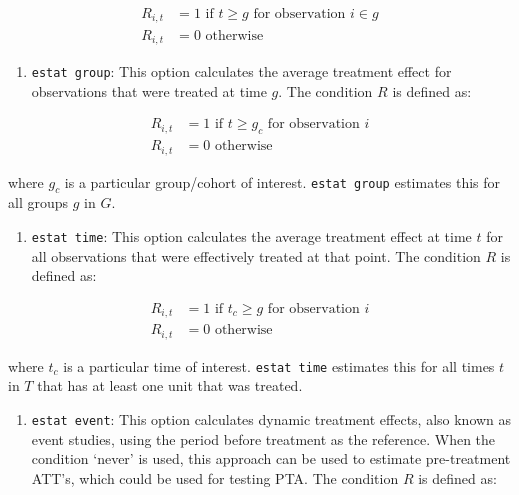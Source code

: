 \documentclass[
  letterpaper,
  DIV=11,
  numbers=noendperiod]{scrartcl}
\providecommand{\tightlist}{%
  \setlength{\itemsep}{0pt}\setlength{\parskip}{0pt}}\usepackage{longtable,booktabs,array}
\begin{document}
\[\begin{aligned}
R_{i,t} &= 1 \text{ if } t \geq g \text{ for observation } i \in g \\
R_{i,t} &= 0 \text{ otherwise}
\end{aligned}
\]

\begin{enumerate}
\def\labelenumi{\arabic{enumi}.}
\setcounter{enumi}{1}
\tightlist
\item
  \texttt{estat\ group}: This option calculates the average treatment
  effect for observations that were treated at time \(g\). The condition
  \(R\) is defined as:
\end{enumerate}

\[\begin{aligned}
R_{i,t} &= 1 \text{ if } t \geq g_c \text{ for observation } i \\
R_{i,t} &= 0 \text{ otherwise}
\end{aligned}
\]

where \(g_c\) is a particular group/cohort of interest.
\texttt{estat\ group} estimates this for all groups \(g\) in \(G\).

\begin{enumerate}
\def\labelenumi{\arabic{enumi}.}
\setcounter{enumi}{2}
\tightlist
\item
  \texttt{estat\ time}: This option calculates the average treatment
  effect at time \(t\) for all observations that were effectively
  treated at that point. The condition \(R\) is defined as:
\end{enumerate}

\[\begin{aligned}
R_{i,t} &= 1 \text{ if } t_c \geq g \text{ for observation } i \\
R_{i,t} &= 0 \text{ otherwise}
\end{aligned}
\]

where \(t_c\) is a particular time of interest. \texttt{estat\ time}
estimates this for all times \(t\) in \(T\) that has at least one unit
that was treated.

\begin{enumerate}
\def\labelenumi{\arabic{enumi}.}
\setcounter{enumi}{3}
\tightlist
\item
  \texttt{estat\ event}: This option calculates dynamic treatment
  effects, also known as event studies, using the period before
  treatment as the reference. When the condition `never' is used, this
  approach can be used to estimate pre-treatment ATT's, which could be
  used for testing PTA. The condition \(R\) is defined as:
\end{enumerate}
\end{document}
